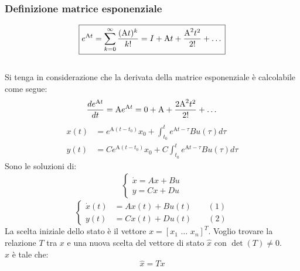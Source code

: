 	\subsubsection{Definizione matrice esponenziale}
	\begin{equation*}
		\boxed{e^{\text At} = \sum_{k = 0}^{\infty}\frac{(\text At)^k}{k!} = I + \text At + \frac{\text A^2t^2}{2!}+\dots}
	\end{equation*}
	\\
	Si tenga in considerazione che la derivata della matrice esponenziale è calcolabile come segue:\\
	\begin{equation*}
		\frac{de^{\text{A}t}}{dt}  = \text Ae^{\text{A} t} = 0 + \text{A} + \frac{2\text A^2 t^2}{2!} + \dots
	\end{equation*}
	\begin{align*}
		x(t) &= e^{\text{A}(t-t_0)} x_0+ \int_{t_0}^{t}e^{\text{A}t-\tau}Bu(\tau)d\tau\\
		y(t) &= Ce^{\text{A}(t-t_0)}x_0+ C \int_{t_0}^{t}e^{\text{A}t-\tau}Bu(\tau)d\tau
	\end{align*}
	Sono le soluzioni di:
	\begin{align*}
		\begin{cases}
			\dot{x} =Ax+Bu\\
			y = Cx+Du
		\end{cases}
	\end{align*}
	\begin{equation*}
		\begin{cases}
			\dot{x}(t) &=Ax(t)+Bu(t)\qquad(1)\\
			y(t) &= Cx(t)+Du(t)\qquad(2)
		\end{cases}
	\end{equation*}
	La scelta iniziale dello stato è il vettore $ x  = [x_1 \,\,\dots\,\,x_n]^T$. Voglio trovare la relazione $ T $ tra $ x $ e una nuova scelta del vettore di stato $ \hat{x} $ con $ \det(T)\neq0 $. \\
	$ \hat{x} $ è tale che:
	\begin{equation*}
		\boxed{\hat{x} = Tx}
	\end{equation*}
